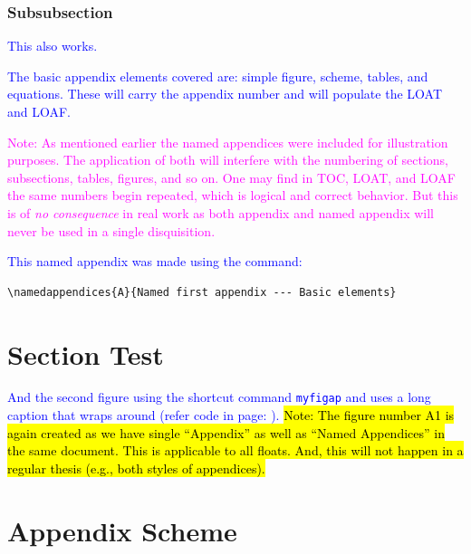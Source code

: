 \documentclass[phd]{ndsu-thesis-2022}
\newcommand\italk[1]{\textcolor{blue}{#1}}  %
\begin{document}
\subsubsection{Subsubsection}
\italk{This also works.}


\italk{The basic appendix elements covered are: simple figure, scheme, tables, and equations. These will carry the appendix number and will populate the LOAT and LOAF.}

\textcolor{magenta}{Note: As mentioned earlier the named appendices were included for illustration purposes. The application of both will interfere with the numbering of sections, subsections, tables, figures, and so on. One may find in TOC, LOAT, and LOAF the same numbers begin repeated, which is logical and correct behavior. But this is of \emph{no consequence} in real work as both appendix and named appendix will never be used in a single disquisition.}

\italk{This named appendix was made using the command:}

\begin{verbatim}
\namedappendices{A}{Named first appendix --- Basic elements}
\end{verbatim}

\section{Section Test}
\italk{And the second figure using the shortcut command \texttt{myfigap} and uses a long caption that wraps around (refer code in page: \pageref{figv}).} \hl{Note: The figure number A1 is again created as we have single ``Appendix'' as well as ``Named Appendices'' in the same document. This is applicable to all floats. And, this will not happen in a regular thesis (e.g., both styles of appendices).}


\kant[1]

\section{Appendix Scheme}\label{appsch}
\end{document}
